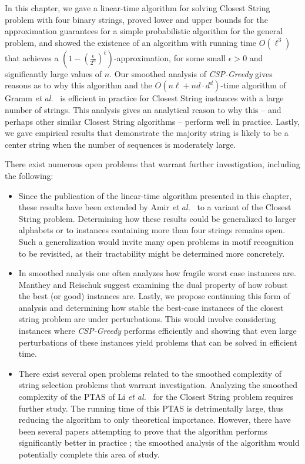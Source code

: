 In this chapter, we gave a linear-time algorithm for solving {\sc Closest String} problem with four binary strings, proved lower and upper bounds for the approximation guarantees for a simple probabilistic algorithm for the general problem, and showed the existence of an algorithm with running time $O(\ell^3)$ that achieves a $\left(1  - \left( \frac{\epsilon}{ 2^{n}} \right)^{\ell}\right)$-approximation, for some small $\epsilon > 0$ and significantly large values of $n$.  Our smoothed analysis of {\em CSP-Greedy} gives reasons as to why this algorithm and the $O(n\ell + nd \cdot d^d)$-time algorithm of Gramm {\em et al.}\ \cite{GNR03} is efficient in practice for {\sc Closest String} instances with a large number of strings. This analysis gives an analytical reason to why this -- and perhaps other similar {\sc Closest String} algorithms -- perform well in practice.  Lastly, we gave empirical results that demonstrate the majority string is likely to be a center string when the number of sequences is moderately large.  

There exist numerous open problems that warrant further investigation, including the following:

\begin{itemize}
\item Since the publication of the linear-time algorithm presented in this chapter, these results have been extended by Amir {\em et al.}\ \cite{amir} to a variant of the {\sc Closest String} problem. Determining how these results could be generalized to larger alphabets or to instances containing more than four strings remains open. Such a generalization would invite many open problems in motif recognition to be revisited, as their tractability might be determined more concretely. 

\item In smoothed analysis one often analyzes how fragile worst case instances are. Manthey and Reischuk \cite{MR05} suggest examining the dual property of how robust the best (or good) instances are.  Lastly, we propose continuing this form of analysis and determining how stable the best-case instances of the closest string problem are under perturbations. This would involve considering instances where {\em CSP-Greedy} performs efficiently and showing that even large perturbations of these instances yield problems that can be solved in efficient time.

\item There exist several open problems related to the smoothed complexity of string selection problems that warrant investigation.  Analyzing the smoothed complexity of the PTAS of Li {\em et al.}\ \cite{LMW02} for the {\sc Closest String} problem requires further study.  The running time of this PTAS is detrimentally large, thus reducing the algorithm to only theoretical importance.  However, there have been several papers attempting to prove that the algorithm performs significantly better in practice \cite{brona1,brona2}; the smoothed analysis of the algorithm would potentially complete this area of study.
\end{itemize}
